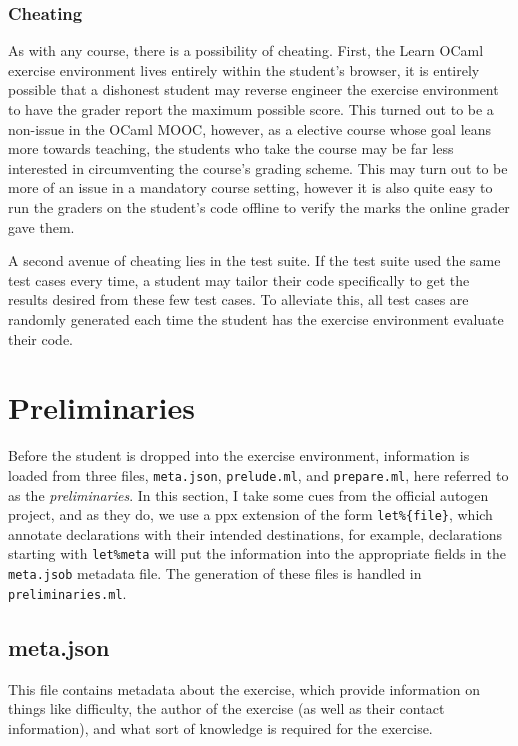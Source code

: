 \documentclass[11pt]{article}
\begin{document}
\subsubsection{Cheating}
As with any course, there is a possibility of cheating. First, the Learn OCaml exercise environment lives entirely within the student's browser, it is entirely possible that a dishonest student may reverse engineer the exercise environment to have the grader report the maximum possible score. This turned out to be a non-issue in the OCaml MOOC, however, as a elective course whose goal leans more towards teaching, the students who take the course may be far less interested in circumventing the course's grading scheme. This may turn out to be more of an issue in a mandatory course setting, however it is also quite easy to run the graders on the student's code offline to verify the marks the online grader gave them.

A second avenue of cheating lies in the test suite. If the test suite used the same test cases every time, a student may tailor their code specifically to get the results desired from these few test cases. To alleviate this, all test cases are randomly generated each time the student has the exercise environment evaluate their code.

\section{Preliminaries}
Before the student is dropped into the exercise environment, information is loaded from three files, \verb+meta.json+, \verb+prelude.ml+, and \verb+prepare.ml+, here referred to as the \textit{preliminaries}. In this section, I take some cues from the official autogen project, and as they do, we use a ppx extension of the form \verb+let%{file}+, which annotate declarations with their intended destinations, for example, declarations starting with \verb+let%meta+ will put the information into the appropriate fields in the \verb+meta.jsob+ metadata file. The generation of these files is handled in \verb+preliminaries.ml+.

\subsection{meta.json}
This file contains metadata about the exercise, which provide information on things like difficulty, the author of the exercise (as well as their contact information), and what sort of knowledge is required for the exercise.
\end{document}
